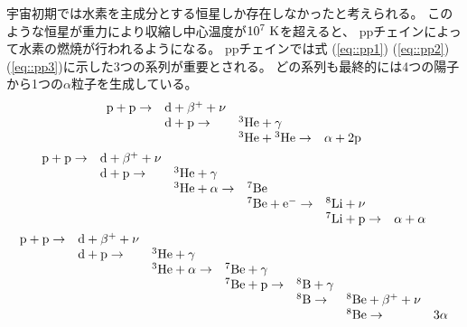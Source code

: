 宇宙初期では水素を主成分とする恒星しか存在しなかったと考えられる。
このような恒星が重力により収縮し中心温度が$10^7~\rm{K}$を超えると、
ppチェインによって水素の燃焼が行われるようになる。
ppチェインでは式 (\ref{eq::pp1}) (\ref{eq::pp2}) (\ref{eq::pp3})に示した3つの系列が重要とされる。
どの系列も最終的には4つの陽子から1つの$\alpha$粒子を生成している。
\begin{gather}
  \begin{array}{llll}
    \rm{p} + \rm{p} \rightarrow & \rm{d} + \beta^{+} + \nu & &\\
    & \rm{d} + \rm{p} \rightarrow & {}^{3}\rm{He} + \gamma &\\
    & & {}^{3}\rm{He} + {}^{3}\rm{He} \rightarrow & \alpha +2\rm{p}
  \end{array}\label{eq::pp1}\\  
  \begin{array}{llllll}
    \rm{p} + \rm{p} \rightarrow & \rm{d} + \beta^{+} +\nu & & & &\\
    & \rm{d} + \rm{p} \rightarrow & {}^{3}\rm{He} + \gamma & & &\\
    & & {}^{3}\rm{He} + \alpha \rightarrow & {}^{7}\rm{Be} & &\\
    & & & {}^{7}\rm{Be} + \rm{e}^{-} \rightarrow & {}^{8}\rm{Li} + \nu &\\
    & & & & {}^{7}\rm{Li} + \rm{p} \rightarrow & \alpha + \alpha
  \end{array}\label{eq::pp2}\\
  \begin{array}{lllllll}
    \rm{p} + \rm{p} \rightarrow & \rm{d} + \beta^{+} + \nu & & & & &\\
    & \rm{d} + \rm{p} \rightarrow & {}^{3}\rm{He} + \gamma & & & &\\
    & & {}^{3}\rm{He} + \alpha \rightarrow & {}^{7}\rm{Be} + \gamma & & &\\
    & & & {}^{7}\rm{Be} + \rm{p} \rightarrow & {}^{8}\rm{B} + \gamma & &\\
    & & & & {}^{8}\rm{B} \rightarrow & {}^{8}\rm{Be} + \beta^{+} + \nu &\\
    & & & & & {}^{8}\rm{Be} \rightarrow & 3\alpha
  \end{array}\label{eq::pp3}
\end{gather}

